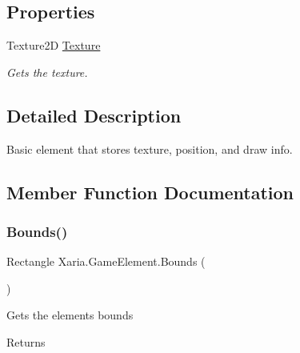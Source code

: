 \subsection*{Properties}
\begin{DoxyCompactItemize}
\item 
Texture2D \hyperlink{classXaria_1_1GameElement_ae5816c3fd6f76aa7af85b1cc9c8a5cf8}{Texture}
\begin{DoxyCompactList}\small\item\em Gets the texture. \end{DoxyCompactList}\end{DoxyCompactItemize}


\subsection{Detailed Description}
Basic element that stores texture, position, and draw info. 



\subsection{Member Function Documentation}
\mbox{\label{classXaria_1_1GameElement_a2b050e61aea8232eba3e820b14c98656}} 
\subsubsection{\texorpdfstring{Bounds()}{Bounds()}}
{\footnotesize\ttfamily Rectangle Xaria.\+Game\+Element.\+Bounds (\begin{DoxyParamCaption}{ }\end{DoxyParamCaption})\hspace{0.3cm}{\ttfamily [inline]}}



Gets the element\textquotesingle{}s bounds 

\begin{DoxyReturn}{Returns}

\end{DoxyReturn}
\mbox{\label{classXaria_1_1GameElement_a7f93dc93e970e72a5540924e06d28c92}} 
